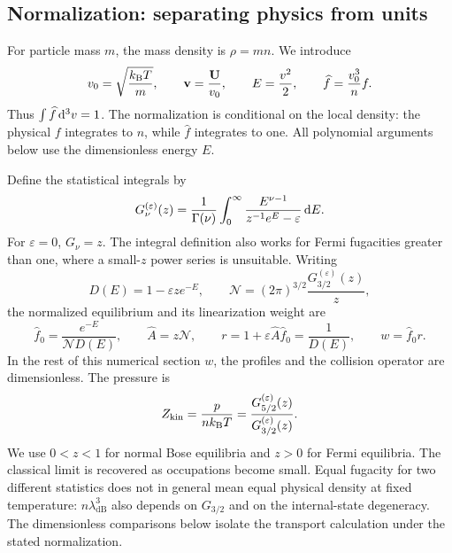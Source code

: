 \subsection{Normalization: separating physics from units}
For particle mass $m$, the mass density is $\rho=mn$. We introduce
\begin{equation}
 v_0=\sqrt{\frac{k_{\mathrm B}T}{m}},\qquad
 \mathbf v=\frac{\mathbf U}{v_0},\qquad
 E=\frac{v^2}{2},\qquad
 \widehat f=\frac{v_0^3}{n}f.
 \label{qt:units}
\end{equation}
Thus $\int\widehat f\,\mathrm d^3v=1$. The normalization is conditional on the local
density: the physical $f$ integrates to $n$, while $\widehat f$ integrates
to one. All polynomial arguments below use the dimensionless energy $E$.

Define the statistical integrals by
\begin{equation}
 G_\nu^{(\varepsilon)}(z)
 =\frac1{\Gamma(\nu)}\int_0^\infty
 \frac{E^{\nu-1}}{z^{-1}e^E-\varepsilon}\,\mathrm d E.
 \label{qt:G}
\end{equation}
For $\varepsilon=0$, $G_\nu=z$. The integral definition also works for
Fermi fugacities greater than one, where a small-$z$ power series is unsuitable.
Writing
\begin{equation}
 D(E)=1-\varepsilon ze^{-E},\qquad
 \mathcal N=(2\pi)^{3/2}\frac{G_{3/2}^{(\varepsilon)}(z)}{z},
\end{equation}
the normalized equilibrium and its linearization weight are
\begin{equation}
 \widehat f_0=\frac{e^{-E}}{\mathcal N D(E)},\qquad
 \widehat A=z\mathcal N,\qquad
 r=1+\varepsilon\widehat A\widehat f_0=\frac1{D(E)},\qquad
 w=\widehat f_0r.
 \label{qt:equilibrium}
\end{equation}
In the rest of this numerical section $w$, the profiles and the collision
operator are dimensionless. The pressure is
\begin{equation}
 Z_{\mathrm{kin}}=\frac{p}{nk_{\mathrm B}T}
 =\frac{G_{5/2}^{(\varepsilon)}(z)}{G_{3/2}^{(\varepsilon)}(z)}.
 \label{qt:Z}
\end{equation}
We use $0<z<1$ for normal Bose equilibria and $z>0$ for Fermi equilibria.
The classical limit is recovered as occupations become small. Equal fugacity
for two different statistics does not in general mean equal physical density
at fixed temperature: $n\lambda_{\mathrm{dB}}^3$ also depends on $G_{3/2}$
and on the internal-state degeneracy. The dimensionless comparisons below
isolate the transport calculation under the stated normalization.

